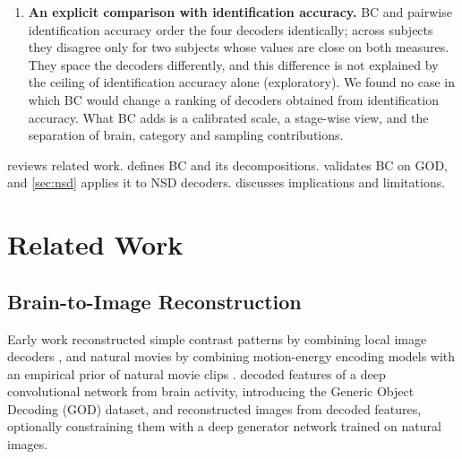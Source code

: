 \documentclass[11pt,a4paper]{article}
\begin{document}
\begin{enumerate}[leftmargin=1.5em]
  \item \textbf{An explicit comparison with identification accuracy.} BC and
    pairwise identification accuracy order the four decoders identically; across
    subjects they disagree only for two subjects whose values are close on both
    measures. They space the decoders differently, and this difference is not
    explained by the ceiling of identification accuracy alone (exploratory). We
    found no case in which BC would change a ranking of decoders obtained from
    identification accuracy. What BC adds is a calibrated scale, a stage-wise
    view, and the separation of brain, category and sampling contributions.
\end{enumerate}

 reviews related work.  defines BC and its
decompositions.  validates BC on GOD, and \cref{sec:nsd} applies
it to NSD decoders.  discusses implications and
limitations.

\section{Related Work}
\label{sec:related}

\subsection{Brain-to-Image Reconstruction}

Early work reconstructed simple contrast patterns by combining local image
decoders \citep{miyawaki2008}, and natural movies by combining motion-energy
encoding models with an empirical prior of natural movie clips
\citep{nishimoto2011}.
\citet{horikawa2017} decoded features of a deep convolutional network from
brain activity, introducing the Generic Object Decoding (GOD) dataset, and
\citet{shen2019} reconstructed images from decoded features, optionally
constraining them with a deep generator network trained on natural images.
\end{document}
